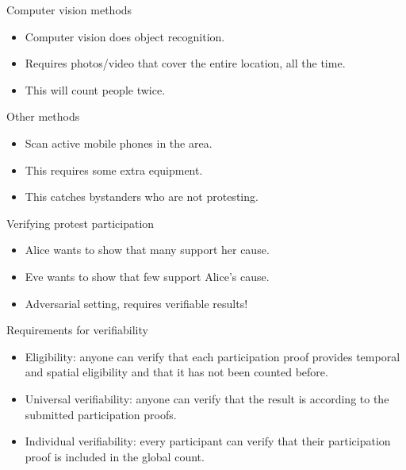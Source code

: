 \begin{columns}[t]
\begin{column}{0.32\linewidth}
    \begin{orangeblock}{Computer vision methods}
      \begin{itemize}
        \item Computer vision does object recognition.
        \item Requires photos/video that cover the entire location, all the time.
        \item \color{red} This will count people twice.
      \end{itemize}
    \end{orangeblock}

    \begin{orangeblock}{Other methods}
      \begin{itemize}
        \item Scan active mobile phones in the area.
        \item This requires some extra equipment.
        \item \color{red} This catches bystanders who are not protesting.
      \end{itemize}
    \end{orangeblock}

    \begin{redblock}{Verifying protest participation}
      \begin{itemize}
        \item Alice wants to show that many support her cause.
        \item Eve wants to show that few support Alice's cause.
        \item \color{red} Adversarial setting, requires verifiable results!
      \end{itemize}
    \end{redblock}

    \begin{blueblock}{Requirements for verifiability}
      \begin{itemize}
        \item\label{EligibilityVerif} Eligibility: anyone can verify that each 
          participation proof provides temporal and spatial eligibility and that 
          it has not been counted before.

        \item\label{UniversalVerif} Universal verifiability: anyone can verify 
          that the result is according to the submitted participation proofs.

        \item\label{IndividualVerif} Individual verifiability: every participant 
          can verify that their participation proof is included in the global 
          count.
      \end{itemize}
    \end{blueblock}


\end{column}
\end{columns}
